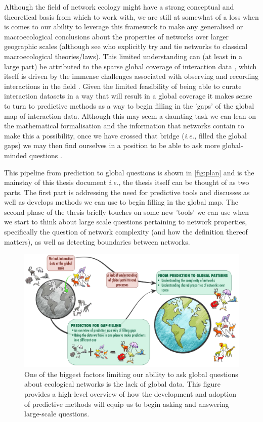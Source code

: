 Although the field of network ecology might have a strong conceptual and
theoretical basis from which to work with, we are still at somewhat of a
loss when is comes to our ability to leverage this framework to make any
generalised or macroecological conclusions about the properties of networks
over larger geographic scales (although see \cite{Baiser2019Ecogeographical, Pinheiro2023Latitudinal} who explicitly try and tie networks to classical macroecological theories/laws). This limited understanding can (at least in a large part) be attributed to the sparse global coverage of interaction data \cite{Poisot2021GloKno, Cameron2019UneGlo}, which itself is driven by the immense challenges associated with observing and recording interactions in the field \cite{Bennett2019PotPit, Jordano2016SamNet}. Given the limited feasibility of being able to curate interaction datasets in a way that will result in a global coverage it makes sense to turn to predictive methods as a way to begin filling in the 'gaps' of the global map of interaction data. Although this may seem a daunting task we can lean on the mathematical formalisation and the information that networks contain to make this a possibility, once we have crossed that bridge (\emph{i.e.,} filled the global gaps) we may then find ourselves in a position to be able to ask more global-minded questions \cite{Windsor2023Using, ThuillerNavigating}.

This pipeline from prediction to global questions is shown in \autoref{fig:plan} and is the mainstay of this thesis document \emph{i.e.,} the thesis itself can be thought of as two parts. The first part is addressing the need for predictive tools and discusses as well as develops methods we can use to begin filling in the global map. The second phase of the thesis briefly touches on some new 'tools' we can use when we start to think about large scale questions pertaining to network properties, specifically the question of network complexity (and how the definition thereof matters), as well as detecting boundaries between networks.

\begin{figure}[h]
    \centering
    \includegraphics[width=\textwidth]{figures/thesis-flowchart.jpg}
    \caption{One of the biggest factors limiting our ability to ask global questions about ecological networks is the lack of global data. This figure provides a high-level overview of how the development and adoption of predictive methods will equip us to begin asking and answering large-scale questions.}
    \label{fig:plan}
\end{figure}

